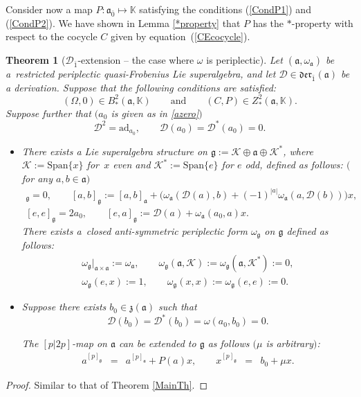 \documentclass[10pt,a4paper]{amsart}
\numberwithin{equation}{section}
\newtheorem{Theorem}{Theorem}[section]
\begin{document}
Consider now a map $P\colon \mathfrak{a}_{\bar 0} \mapsto \mathbb{K}$
satisfying the conditions (\ref{CondP1}) and (\ref{CondP2}). We have shown in Lemma \ref{*property} that $P$ has the $*$-property with respect to the cocycle $C$ given by equation~(\ref{CEcocycle}).
\begin{Theorem}[${\mathscr D}_{\bar 1}$-extension -- the case where $\omega$ is periplectic]\label{MainThOO} Let $(\mathfrak{a}, \omega_\mathfrak{a})$ be a~restricted periplectic quasi-Frobenius Lie superalgebra, and let ${\mathscr D}\in \mathfrak{der}_{\bar 1}(\mathfrak{a})$ be a derivation. Suppose that the following conditions are satisfied:
\[
(\Omega, 0) \in B^2_*(\mathfrak{a}, \mathbb{K}) \qquad \text{and} \qquad (C, P) \in Z^2_*(\mathfrak{a}, \mathbb{K}).
\]
Suppose further that $(a_0$ is given as in \eqref{azero}$)$
\[
{\mathscr D}^2=\mathrm{ad}_{a_0}, \qquad {\mathscr D}(a_0)={\mathscr D}^*(a_0)=0.
\]
\begin{itemize}
\item[$(i)$] There exists a Lie superalgebra structure on $\mathfrak{g}:=\mathscr{K} \oplus \mathfrak{a} \oplus \mathscr{K} ^*$, where $\mathscr{K} :=\mathrm{Span}\{x\}$ for~$x$ even and $\mathscr{K}^* :=\mathrm{Span}\{e\}$ for $e$ odd, defined as follows: $($for any $a, b\in \mathfrak{a})$
\begin{gather*}
[\mathscr{K} ,\mathfrak{g}]_\mathfrak{g}=0, \qquad [a,b]_\mathfrak{g} := [a,b]_\mathfrak{a} + \bigl(\omega_\mathfrak{a}( {\mathscr D}(a), b) +(-1)^{|a|}\omega_\mathfrak{a}(a, {\mathscr D}(b))\bigr)x, \\
[e, e]_\mathfrak{g}=2 a_0, \qquad [e,a]_\mathfrak{g} := {\mathscr D}(a) + \omega_\mathfrak{a}(a_0,a)x.
\end{gather*}
There exists a~closed anti-symmetric periplectic form $\omega_\mathfrak{g}$ on $\mathfrak{g}$ defined as follows:
\begin{gather*}
{\omega_\mathfrak{g}}\vert_{\mathfrak{a} \times \mathfrak{a}}:= \omega_\mathfrak{a}, \qquad \omega_\mathfrak{g}(\mathfrak{a},\mathscr{K} ):=\omega_\mathfrak{g}(\mathfrak{a},\mathscr{K} ^*):=0, \\ \omega_\mathfrak{g}(e,x):=1, \qquad
\omega_\mathfrak{g}(x,x):=\omega_\mathfrak{g}(e,e) :=0.
\end{gather*}
\item[$(ii)$] Suppose there exists $b_0\in \mathfrak{z}(\mathfrak{a})$ such that
\[
{\mathscr D}(b_0)={\mathscr D}^*(b_0)=\omega (a_0, b_0)=0.
\]


The $[p|2p]$-map on $\mathfrak{a}$ can be extended to $\mathfrak{g}$ as follows $(\mu$ is arbitrary$)$:
\[
\begin{array}{lcllcl}
a^{[p]_\mathfrak{g}} & = & a^{[p]_\mathfrak{a}} +P(a)x, \qquad
x^{[p]_\mathfrak{g}} & =& b_0+\mu x.
\end{array}
\]
\end{itemize}
\end{Theorem}
\begin{proof}
Similar to that of Theorem \ref{MainTh}.
\end{proof}
\end{document}
